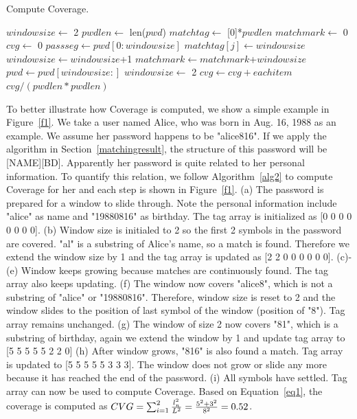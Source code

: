 \begin{algorithm}[!]
\caption{Compute Coverage.}
\label{alg2}
\begin{algorithmic}[1]
\State $windowsize \gets$ 2
\State $pwdlen \gets$ len($pwd$)
\State $matchtag \gets$ [0]*$pwdlen$
\State $matchmark \gets $ 0
\State $cvg \gets $ 0
\State $passseg \gets pwd[0:windowsize]$
\State $matchtag[j] \gets windowsize$
\EndFor
{}
\State $windowsize \gets windowsize$+1
\EndIf
\Else
\State $matchmark \gets matchmark$+$windowsize$
\State $pwd \gets pwd[windowsize:]$
\State $windowsize \gets$ 2
\EndIf
\EndWhile
{}
\State $cvg \gets cvg + eachitem$
\EndFor
\State \Return $cvg/(pwdlen * pwdlen)$
\EndProcedure
\end{algorithmic}
\end{algorithm}

To better illustrate how Coverage is computed, we show a simple example in Figure~\ref{f1}. We take a user named Alice, who was born in Aug. 16, 1988 as an example. We assume her password happens to be "alice816". If we apply the algorithm in Section~\ref{matchingresult}, the structure of this password will be [NAME][BD]. Apparently her password is quite related to her personal information. To quantify this relation, we follow Algorithm~\ref{alg2} to compute Coverage for her and each step is shown in Figure~\ref{f1}. (a) The password is prepared for a window to slide through. Note the personal information include "alice" as name and "19880816" as birthday. The tag array is initialized as [0 0 0 0 0 0 0 0]. (b) Window size is initialed to 2 so the first 2 symbols in the password are covered. "al" is a substring of Alice's name, so a match is found. Therefore we extend the window size by 1 and the tag array is updated as [2 2 0 0 0 0 0 0]. (c)-(e) Window keeps growing because matches are continuously found. The tag array also keeps updating. (f) The window now covers "alice8", which is not a substring of "alice" or "19880816". Therefore, window size is reset to 2 and the window slides to the position of last symbol of the window (position of "8"). Tag array remains unchanged. (g) The window of size 2 now covers "81", which is a substring of birthday, again we extend the window by 1 and update tag array to [5 5 5 5 5 2 2 0] (h) After window grows, "816" is also found a match. Tag array is updated to [5 5 5 5 5 3 3 3]. The window does not grow or slide any more because it has reached the end of the password. (i) All symbols have settled. Tag array can now be used to compute Coverage. Based on Equation~\ref{eq1}, the coverage is computed as $CVG  = \sum_{i=1}^2 {{l_n^2} \over {L^2}} = {{5^2 + 3^2}\over{8^2}}= 0.52$.

